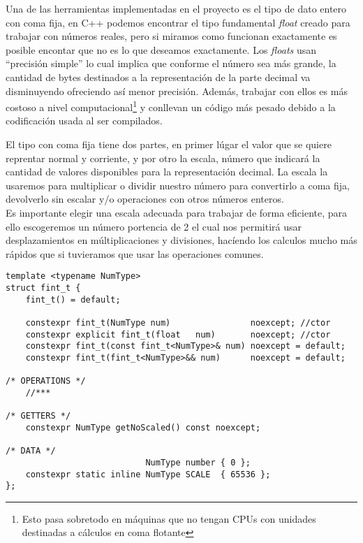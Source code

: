 Una de las herramientas implementadas en el proyecto es el tipo de dato entero con coma fija,
en C++ podemos encontrar el tipo fundamental \textit{float} creado para trabajar con números 
reales, pero si miramos como funcionan exactamente es posible encontar que no es lo que deseamos
exactamente. Los \textit{floats} usan ``precisión simple'' lo cual implica que conforme el número 
sea más grande, la cantidad de bytes destinados a la representación de la parte decimal va 
disminuyendo ofreciendo así menor precisión. Además, trabajar con ellos es más costoso a nivel
computacional\footnote{Esto pasa sobretodo en máquinas que no tengan CPUs con unidades destinadas 
a cálculos en coma flotante} y conllevan un código más pesado debido a la codificación usada 
al ser compilados.

El tipo con coma fija tiene dos partes, en primer lúgar el valor que se quiere reprentar normal
y corriente, y por otro la escala, número que indicará la cantidad de valores disponibles
para la representación decimal. La escala la usaremos para multiplicar o dividir nuestro número
para convertirlo a coma fija, devolverlo sin escalar y/o operaciones con otros números enteros.\\
Es importante elegir una escala adecuada para trabajar de forma eficiente, para ello escogeremos
un número portencia de 2 el cual nos permitirá usar desplazamientos en múltiplicaciones y divisiones,
hacíendo los calculos mucho más rápidos que si tuvieramos que usar las operaciones comunes.

\newpage

\begin{lstlisting}[style=CodigoC++, caption={Entero coma fija},label=fint_t]
template <typename NumType>
struct fint_t {
    fint_t() = default;

    constexpr fint_t(NumType num)                noexcept; //ctor
    constexpr explicit fint_t(float   num)       noexcept; //ctor
    constexpr fint_t(const fint_t<NumType>& num) noexcept = default; 
    constexpr fint_t(fint_t<NumType>&& num)      noexcept = default;

/* OPERATIONS */
	//***

/* GETTERS */
    constexpr NumType getNoScaled() const noexcept;
    
/* DATA */    
                            NumType number { 0 };
    constexpr static inline NumType SCALE  { 65536 };
};
\end{lstlisting}

\placeholdertext{\%--}

